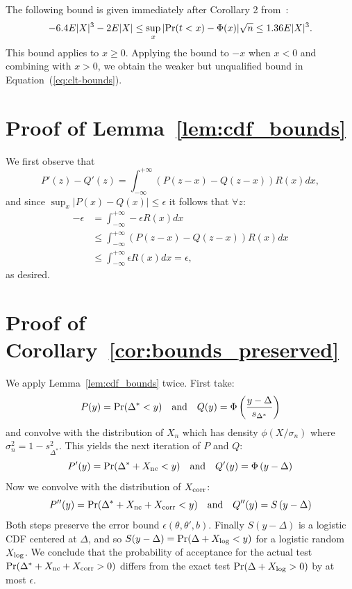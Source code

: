 \documentclass{article}
\begin{document}
The following bound is given immediately after Corollary 2 from~\cite{explicit-clt05}:
\begin{equation}
-6.4E|X|^3-2E|X| \leq \sup_x|{\rm Pr}(t<x)-\Phi(x)|{\sqrt{n}} \leq 1.36E|X|^3.
\end{equation}
This bound applies to $x\geq 0$. Applying the bound to $-x$ when $x<0$
and combining with $x>0$, we obtain the weaker but unqualified bound
in Equation~(\ref{eq:clt-bounds}).



\section{Proof of Lemma~\ref{lem:cdf_bounds}}\label{app:proof_cdf_bounds}

We first observe that
\[
    P'(z) - Q'(z) = \int_{-\infty}^{+\infty}(P(z-x)-Q(z-x))R(x) dx,
\]
and since $\sup_x|P(x)-Q(x)|\leq \epsilon$ it follows that $\forall z$:
\begin{align*}
-\epsilon &= \int_{-\infty}^{+\infty} -\epsilon R(x) dx \\
&\leq \int_{-\infty}^{+\infty}(P(z-x)-Q(z-x))R(x) dx \\
&\leq \int_{-\infty}^{+\infty}\epsilon R(x) dx = \epsilon,
\end{align*}
as desired.



\section{Proof of Corollary~\ref{cor:bounds_preserved}}\label{app:bounds_preserved}

We apply Lemma~\ref{lem:cdf_bounds} twice. First take:
\begin{equation}
    P(y) = {\rm Pr}(\Delta^* < y)
     \quad {\rm and} \quad Q(y) = \Phi\left(\frac{y-\Delta}{s_{\Delta^*}}\right)
\end{equation}
and convolve with the distribution of $X_n$ which has density $\phi(X/\sigma_n)$
where $\sigma_n^2 = 1 - s^2_{\Delta^*}$. This yields the next iteration of $P$
and $Q$:
\begin{equation}
    P'(y) = {\rm Pr}(\Delta^*+X_{\rm nc} < y)
    \quad {\rm and}\quad Q'(y) = \Phi\left({y-\Delta}\right)
\end{equation}
Now we convolve with the distribution of $X_{\rm corr}$:
\begin{equation}
    P''(y) = {\rm Pr}(\Delta^*+X_{\rm nc}+X_{\rm corr} < y)
    \quad {\rm and}\quad Q''(y) = S\left({y-\Delta}\right)
\end{equation}
Both steps preserve the error bound $\epsilon(\theta,\theta',b)$. Finally
$S(y-\Delta)$ is a logistic CDF centered at $\Delta$, and so $S(y-\Delta) = {\rm
Pr}(\Delta + X_{\rm log} < y)$ for a logistic random $X_{\rm log}$. We conclude
that the probability of acceptance for the actual test ${\rm Pr}(\Delta^*+X_{\rm
nc}+X_{\rm corr} > 0)$ differs from the exact test ${\rm Pr}(\Delta+X_{\rm
log} > 0)$ by at most $\epsilon$.
\end{document}
